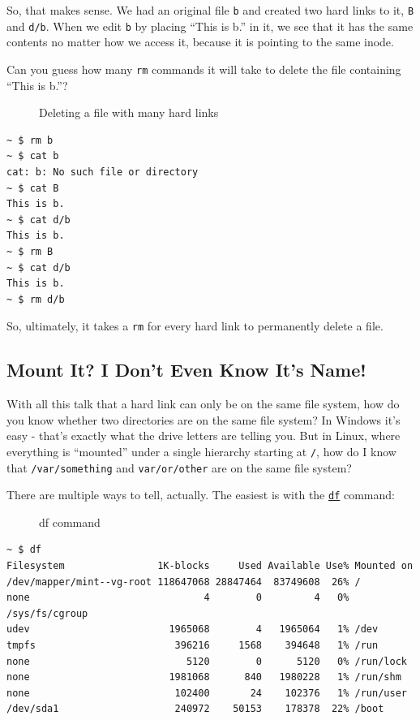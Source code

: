 \documentclass[10pt,]{book}
\numberwithin{figure}{chapter}
\DeclareRobustCommand{\drcap}[1]{\begin{figure}[H]\caption{#1}\end{figure}}
\DeclareRobustCommand{\drcmd}[1]{\index{Commands!#1}}
\begin{document}
So, that makes sense. We had an original file \texttt{b} and created two
hard links to it, \texttt{B} and \texttt{d/b}. When we edit \texttt{b}
by placing ``This is b.'' in it, we see that it has the same contents no
matter how we access it, because it is pointing to the same inode.

Can you guess how many \texttt{rm} commands it will take to delete the
file containing ``This is b.''?

\drcap{Deleting a file with many hard links}

\begin{verbatim}
~ $ rm b
~ $ cat b
cat: b: No such file or directory
~ $ cat B
This is b.
~ $ cat d/b
This is b.
~ $ rm B
~ $ cat d/b
This is b.
~ $ rm d/b
\end{verbatim}

So, ultimately, it takes a \texttt{rm} for every hard link to
permanently delete a file.

\subsection{Mount It? I Don't Even Know It's
Name!}\label{mount-it-i-dont-even-know-its-name}

With all this talk that a hard link can only be on the same file system,
how do you know whether two directories are on the same file system? In
Windows it's easy - that's exactly what the drive letters are telling
you. But in Linux, where everything is ``mounted'' under a single
hierarchy starting at \texttt{/}, how do I know that
\texttt{/var/something} and \texttt{var/or/other} are on the same file
system?

There are multiple ways to tell, actually. The easiest is with the
\href{http://linux.die.net/man/1/df}{\texttt{df}}\drcmd{df} command:

\drcap{df command}

\begin{verbatim}
~ $ df
Filesystem                1K-blocks     Used Available Use% Mounted on
/dev/mapper/mint--vg-root 118647068 28847464  83749608  26% /
none                              4        0         4   0% /sys/fs/cgroup
udev                        1965068        4   1965064   1% /dev
tmpfs                        396216     1568    394648   1% /run
none                           5120        0      5120   0% /run/lock
none                        1981068      840   1980228   1% /run/shm
none                         102400       24    102376   1% /run/user
/dev/sda1                    240972    50153    178378  22% /boot
\end{verbatim}
\end{document}

